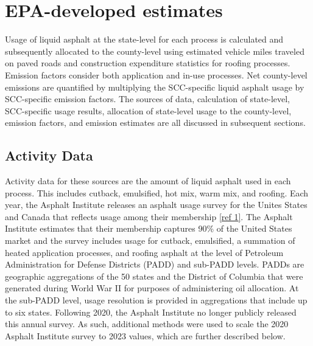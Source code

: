 \documentclass[
  11pt,
  oneside]{book}
\begin{document}
\section{EPA-developed estimates}\label{epa-developed-estimates-1}

Usage of liquid asphalt at the state-level for each process is calculated and subsequently allocated to the county-level using estimated vehicle miles traveled on paved roads and construction expenditure statistics for roofing processes. Emission factors consider both application and in-use processes. Net county-level emissions are quantified by multiplying the SCC-specific liquid asphalt usage by SCC-specific emission factors. The sources of data, calculation of state-level, SCC-specific usage results, allocation of state-level usage to the county-level, emission factors, and emission estimates are all discussed in subsequent sections.

\subsection{Activity Data}\label{activity-data-1}

Activity data for these sources are the amount of liquid asphalt used in each process. This includes cutback, emulsified, hot mix, warm mix, and roofing. Each year, the Asphalt Institute releases an asphalt usage survey for the Unites States and Canada that reflects usage among their membership \hyperref[asphalt-references]{{[}ref 1{]}}. The Asphalt Institute estimates that their membership captures 90\% of the United States market and the survey includes usage for cutback, emulsified, a summation of heated application processes, and roofing asphalt at the level of Petroleum Administration for Defense Districts (PADD) and sub-PADD levels. PADDs are geographic aggregations of the 50 states and the District of Columbia that were generated during World War II for purposes of administering oil allocation. At the sub-PADD level, usage resolution is provided in aggregations that include up to six states. Following 2020, the Asphalt Institute no longer publicly released this annual survey. As such, additional methods were used to scale the 2020 Asphalt Institute survey to 2023 values, which are further described below.
\end{document}
